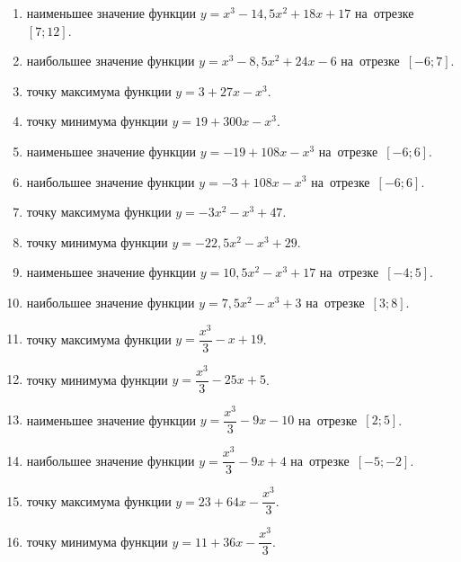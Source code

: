\documentclass[a4paper,10pt]{article}
\begin{document}
\begin{enumerate}
\item {} наименьшее значение функции $y=x^3 -14,5x^2+18x+17$ на~отрезке~$\left[7;12\right]$.

\item {} наибольшее значение функции $y=x^3 -8,5x^2+24x-6$ на~отрезке~$\left[-6;7\right]$.

\item {} точку максимума функции $y=3+27x-x^3$.

\item {} точку минимума функции $y=19+300x-x^3$.

\item {} наименьшее значение функции $y=-19+108x-x^3$ на~отрезке~$\left[-6;6\right]$.

\item {} наибольшее значение функции $y=-3+108x-x^3$ на~отрезке~$\left[-6;6\right]$.

\item {} точку максимума функции $y=-3x^2-x^3+47$.

\item {} точку минимума функции $y=-22,5x^2-x^3+29$.

\item {} наименьшее значение функции $y=10,5x^2-x^3+17$ на~отрезке~$\left[-4;5\right]$.

\item {} наибольшее значение функции $y=7,5x^2-x^3+3$ на~отрезке~$\left[3;8\right]$.

\item {} точку максимума функции $y=\dfrac{x^3}{3} -x+19$.

\item {} точку минимума функции $y=\dfrac{x^3}{3} -25x+5$.

\item {} наименьшее значение функции $y=\dfrac{x^3}{3} -9x-10$ на~отрезке~$\left[2;5\right]$.

\item {} наибольшее значение функции $y=\dfrac{x^3}{3} -9x+4$ на~отрезке~$\left[-5;-2\right]$.

\item {} точку максимума функции $y=23 +64x-\dfrac{x^3}{3}$.

\item {} точку минимума функции $y=11 +36x-\dfrac{x^3}{3}$.


\end{enumerate}
\end{document}
